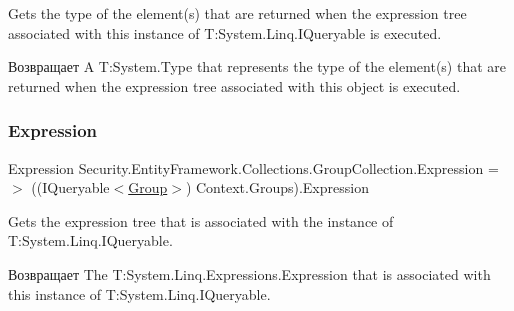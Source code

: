 Gets the type of the element(s) that are returned when the expression tree associated with this instance of T\+:\+System.\+Linq.\+I\+Queryable is executed. 

\begin{DoxyReturn}{Возвращает}
A T\+:\+System.\+Type that represents the type of the element(s) that are returned when the expression tree associated with this object is executed. 
\end{DoxyReturn}
\mbox{\label{class_security_1_1_entity_framework_1_1_collections_1_1_group_collection_adb3b54e01175990f3978e7ded1cfc696}} 
\subsubsection{\texorpdfstring{Expression}{Expression}}
{\footnotesize\ttfamily Expression Security.\+Entity\+Framework.\+Collections.\+Group\+Collection.\+Expression =$>$ ((I\+Queryable$<$\hyperlink{class_security_1_1_model_1_1_group}{Group}$>$) Context.\+Groups).Expression}



Gets the expression tree that is associated with the instance of T\+:\+System.\+Linq.\+I\+Queryable. 

\begin{DoxyReturn}{Возвращает}
The T\+:\+System.\+Linq.\+Expressions.\+Expression that is associated with this instance of T\+:\+System.\+Linq.\+I\+Queryable. 
\end{DoxyReturn}
\mbox{\label{class_security_1_1_entity_framework_1_1_collections_1_1_group_collection_a802e9753a71a089274964309c7417d4e}} 
